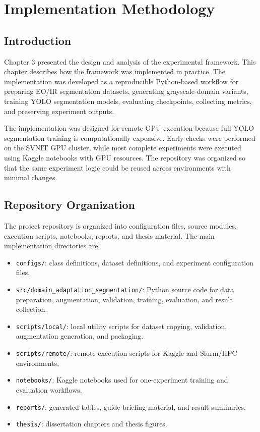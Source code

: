 \chapter{Implementation Methodology}

\section{Introduction}

Chapter 3 presented the design and analysis of the experimental framework. This chapter describes how the framework was implemented in practice. The implementation was developed as a reproducible Python-based workflow for preparing EO/IR segmentation datasets, generating grayscale-domain variants, training YOLO segmentation models, evaluating checkpoints, collecting metrics, and preserving experiment outputs.

The implementation was designed for remote GPU execution because full YOLO segmentation training is computationally expensive. Early checks were performed on the SVNIT GPU cluster, while most complete experiments were executed using Kaggle notebooks with GPU resources. The repository was organized so that the same experiment logic could be reused across environments with minimal changes.

\section{Repository Organization}

The project repository is organized into configuration files, source modules, execution scripts, notebooks, reports, and thesis material. The main implementation directories are:

\begin{itemize}
    \item \texttt{configs/}: class definitions, dataset definitions, and experiment configuration files.
    \item \texttt{src/domain\_adaptation\_segmentation/}: Python source code for data preparation, augmentation, validation, training, evaluation, and result collection.
    \item \texttt{scripts/local/}: local utility scripts for dataset copying, validation, augmentation generation, and packaging.
    \item \texttt{scripts/remote/}: remote execution scripts for Kaggle and Slurm/HPC environments.
    \item \texttt{notebooks/}: Kaggle notebooks used for one-experiment training and evaluation workflows.
    \item \texttt{reports/}: generated tables, guide briefing material, and result summaries.
    \item \texttt{thesis/}: dissertation chapters and thesis figures.
\end{itemize}

